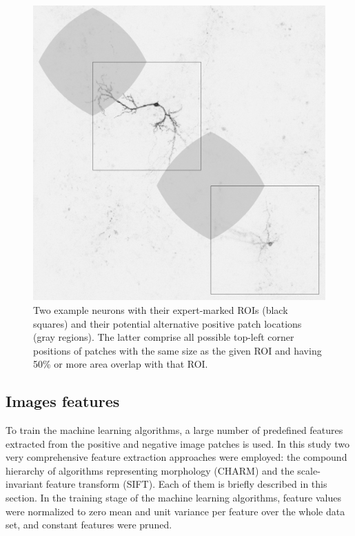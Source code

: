 \begin{figure}
	\begin{minipage}{0.3\textwidth}
		\includegraphics[width=\textwidth]{fig02}
	\end{minipage}
	\hspace{0.02\textwidth}
	\begin{minipage}{0.65\textwidth}
		\caption{Two example neurons with their expert-marked ROIs (black squares) and their potential alternative positive patch locations (gray regions). The latter comprise all possible top-left corner positions of patches with the same size as the given ROI and having 50\% or more area overlap with that ROI.}
		\label{ch5_fig2}
	\end{minipage}
\end{figure}
\subsection{Images features}
\label{subsec:imageFeaturesExtraction}
To train the machine learning algorithms, a large number of predefined features extracted from the positive and negative image patches is used. In this study two very comprehensive feature extraction approaches were employed: the compound hierarchy of algorithms representing morphology (CHARM) and the scale-invariant feature transform (SIFT). Each of them is briefly described in this section. In the training stage of the machine learning algorithms, feature values were normalized to zero mean and unit variance per feature over the whole data set, and constant features were pruned.

